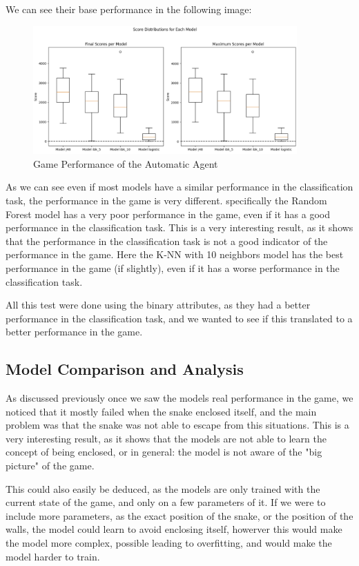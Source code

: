 \documentclass[12pt,a4paper]{article}
\begin{document}
We can see their base performance in the following image:

\begin{figure}[ht]
    \centering
    \includegraphics[width=0.9\textwidth]{./images/main_models.png} %
    \caption{Game Performance of the Automatic Agent}
    \label{fig:game}
\end{figure}

As we can see even if most models have a similar performance in the classification task, the performance in the game is very different.
specifically the Random Forest model has a very poor performance in the game, even if it has a good performance in the classification task.
This is a very interesting result, as it shows that the performance in the classification task is not a good indicator of the performance in the game.
Here the K-NN with 10 neighbors model has the best performance in the game (if slightly), even if it has a worse performance in the classification task.

All this test were done using the binary attributes, as they had a better performance in the classification task, and we wanted to see if this translated to a better performance in the game.

\subsection{Model Comparison and Analysis}

As discussed previously once we saw the models real performance in the game, 
we noticed that it mostly failed when the snake enclosed itself, and the main problem was that the snake was not able to escape from this situations.
This is a very interesting result, as it shows that the models are not able to learn the concept of being enclosed, 
or in general: the model is not aware of the "big picture" of the game.

This could also easily be deduced, as the models are only trained with the current state of the game, and only on a few parameters of it.
If we were to include more parameters, as the exact position of the snake, or the position of the walls, the model could learn to avoid enclosing itself,
howerver this would make the model more complex, possible leading to overfitting, and would make the model harder to train.
\end{document}
